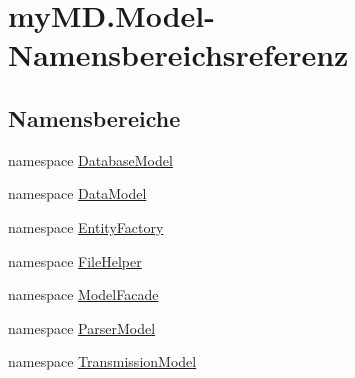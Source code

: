 \hypertarget{namespacemy_m_d_1_1_model}{}\section{my\+M\+D.\+Model-\/\+Namensbereichsreferenz}
\label{namespacemy_m_d_1_1_model}
\subsection*{Namensbereiche}
\begin{DoxyCompactItemize}
\item 
namespace \mbox{\hyperlink{namespacemy_m_d_1_1_model_1_1_database_model}{Database\+Model}}
\item 
namespace \mbox{\hyperlink{namespacemy_m_d_1_1_model_1_1_data_model}{Data\+Model}}
\item 
namespace \mbox{\hyperlink{namespacemy_m_d_1_1_model_1_1_entity_factory}{Entity\+Factory}}
\item 
namespace \mbox{\hyperlink{namespacemy_m_d_1_1_model_1_1_file_helper}{File\+Helper}}
\item 
namespace \mbox{\hyperlink{namespacemy_m_d_1_1_model_1_1_model_facade}{Model\+Facade}}
\item 
namespace \mbox{\hyperlink{namespacemy_m_d_1_1_model_1_1_parser_model}{Parser\+Model}}
\item 
namespace \mbox{\hyperlink{namespacemy_m_d_1_1_model_1_1_transmission_model}{Transmission\+Model}}
\end{DoxyCompactItemize}
